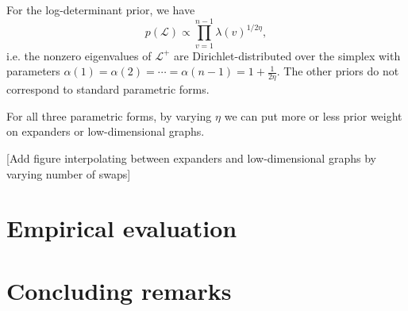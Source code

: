 \documentclass[12pt]{article}
\theoremstyle{plain}
\begin{document}
For the log-determinant prior, we have
\[
  p(\mathcal{L})
    \propto \prod_{v=1}^{n-1} \lambda(v)^{1/2 \eta},
\]
i.e. the nonzero eigenvalues of $\mathcal{L}^{+}$ are
Dirichlet-distributed over the simplex with parameters $\alpha(1) =
\alpha(2) = \dotsb = \alpha(n-1) = 1 + \tfrac{1}{2\eta}$.  The other
priors do not correspond to standard parametric forms.

For all three parametric forms, by varying $\eta$ we can put more or
less prior weight on expanders or low-dimensional graphs.

[Add figure interpolating between expanders and low-dimensional graphs
by varying number of swaps]

\section{Empirical evaluation}

\section{Concluding remarks}



\end{document}
